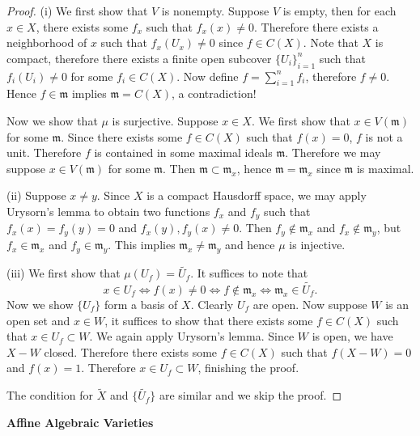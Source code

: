 \begin{proof}
(i) We first show that $V$ is nonempty. Suppose $V$ is empty, then for each $x\in X$, there exists some $f_x$ such that $f_x(x)\ne 0$. Therefore there exists a neighborhood of $x$ such that $f_x(U_x)\ne 0$ since $f\in C(X)$. Note that $X$ is compact, therefore there exists a finite open subcover $\{U_i\}_{i=1}^n$ such that $f_i(U_i)\ne 0$ for some $f_i\in C(X)$. Now define $f=\sum_{i=1}^nf_i$, therefore $f\ne 0$. Hence $f\in\mathfrak{m}$ implies $\mathfrak{m}=C(X)$, a contradiction!\par
Now we show that $\mu$ is surjective. Suppose $x\in X$. We first show that $x\in V(\mathfrak{m})$ for some $\mathfrak{m}$. Since there exists some $f\in C(X)$ such that $f(x)=0$, $f$ is not a unit. Therefore $f$ is contained in some maximal ideals $\mathfrak{m}$. Therefore we may suppose $x\in V(\mathfrak{m})$ for some $\mathfrak{m}$. Then $\mathfrak{m}\subset\mathfrak{m}_x$, hence $\mathfrak{m}=\mathfrak{m}_x$ since $\mathfrak{m}$ is maximal.\par
(ii) Suppose $x\ne y$. Since $X$ is a compact Hausdorff space, we may apply Urysorn's lemma to obtain two functions $f_x$ and $f_y$ such that $f_x(x)=f_y(y)=0$ and $f_x(y),f_y(x)\ne 0$. Then $f_y\notin\mathfrak{m}_x$ and $f_x\notin\mathfrak{m}_y$, but $f_x\in\mathfrak{m}_x$ and $f_y\in\mathfrak{m}_y$. This implies $\mathfrak{m}_x\ne\mathfrak{m}_y$ and hence $\mu$ is injective.\par
(iii) We first show that $\mu(U_f)=\widetilde{U_f}$. It suffices to note that 
$$
x\in U_f\Longleftrightarrow f\left( x \right) \ne 0\Longleftrightarrow f\notin \mathfrak{m} _x\Longleftrightarrow \mathfrak{m} _x\in \widetilde{U_f}.
$$
Now we show $\{U_f\}$ form a basis of $X$. Clearly $U_f$ are open. Now suppose $W$ is an open set and $x\in W$, it suffices to show that there exists some $f\in C(X)$ such that $x\in U_f\subset W$. We again apply Urysorn's lemma. Since $W$ is open, we have $X-W$ closed. Therefore there exists some $f\in C(X)$ such that $f(X-W)=0$ and $f(x)=1$. Therefore $x\in U_f\subset W$, finishing the proof.\par
The condition for $\widetilde{X}$ and $\{\widetilde{U_f}\}$ are similar and we skip the proof.
\end{proof}
\begin{center}
\begin{large}
    \textbf{Affine Algebraic Varieties}
\end{large}
\end{center}
